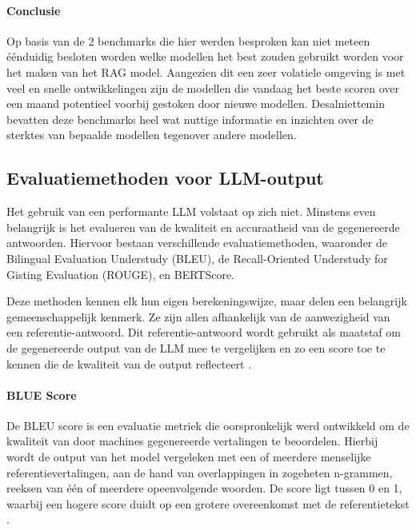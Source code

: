    \paragraph{Conclusie}
    
    Op basis van de 2 benchmarks die hier werden besproken kan niet meteen éénduidig besloten worden welke modellen het best zouden gebruikt worden voor het maken van het RAG model. Aangezien dit een zeer volatiele omgeving is met veel en snelle ontwikkelingen zijn de modellen die vandaag het beste scoren over een maand potentieel voorbij gestoken door nieuwe modellen. Desalniettemin bevatten deze benchmarks heel wat nuttige informatie en inzichten over de sterktes van bepaalde modellen tegenover andere modellen. 
    
    \subsection{Evaluatiemethoden voor LLM-output}
   
    Het gebruik van een performante LLM volstaat op zich niet. Minstens even belangrijk is het evalueren van de kwaliteit en accuraatheid van de gegenereerde antwoorden. Hiervoor bestaan verschillende evaluatiemethoden, waaronder de Bilingual Evaluation Understudy (BLEU), de Recall-Oriented Understudy for Gisting Evaluation (ROUGE), en BERTScore.  
    
    Deze methoden kennen elk hun eigen berekeningswijze, maar delen een belangrijk gemeenschappelijk kenmerk. Ze zijn allen afhankelijk van de aanwezigheid van een referentie-antwoord. Dit referentie-antwoord wordt gebruikt als maatstaf om de gegenereerde output van de LLM mee te vergelijken en zo een score toe te kennen die de kwaliteit van de output reflecteert \cite{microsoft2024evaluation}.
    
    \paragraph{BLUE Score}
    
    De BLEU score is een evaluatie metriek die oorspronkelijk werd ontwikkeld om de kwaliteit van door machines gegenereerde vertalingen te beoordelen. Hierbij wordt de output van het model vergeleken met een of meerdere menselijke referentievertalingen, aan de hand van overlappingen in zogeheten n-grammen, reeksen van één of meerdere opeenvolgende woorden. De score ligt tussen 0 en 1, waarbij een hogere score duidt op een grotere overeenkomst met de referentietekst \cite{papineni-etal-2002-bleu}.
    

